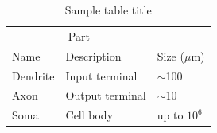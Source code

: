 \documentclass{article}
\begin{document}
\begin{table}
  \caption{Sample table title}
  \label{sample-table}
  \centering
  \begin{tabular}{lll}
    \toprule
    \multicolumn{2}{c}{Part}                   \\
    \cmidrule(r){1-2}
    Name     & Description     & Size ($\mu$m) \\
    \midrule
    Dendrite & Input terminal  & $\sim$100     \\
    Axon     & Output terminal & $\sim$10      \\
    Soma     & Cell body       & up to $10^6$  \\
    \bottomrule
  \end{tabular}
\end{table}
\end{document}
